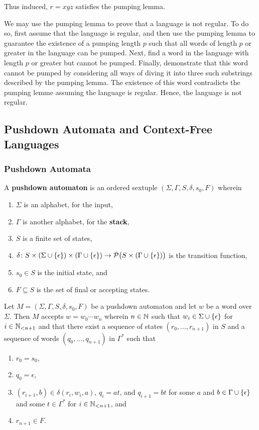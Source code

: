     Thus induced, \(r = x y z\) satisfies the pumping lemma.
\Epr

We may use the pumping lemma to prove that a language is not regular. To do so,
first assume that the language is regular, and then use the pumping lemma to
guarantee the existence of a pumping length \(p\) such that all words of length
\(p\) or greater in the language can be pumped. Next, find a word in the
language with length \(p\) or greater but cannot be pumped. Finally, demonstrate
that this word cannot be pumped by considering all ways of diving it into three
such substrings described by the pumping lemma. The existence of this word
contradicts the pumping lemme assuming the language is regular. Hence, the
language is not regular.

\subsection{Pushdown Automata and Context-Free Languages}

\subsubsection{Pushdown Automata}

\Bdf
    A {\bf pushdown automaton} is an ordered sextuple \((\Sigma, \Gamma, S,
    \delta, s_0, F)\) wherein
    \begin{enumerate}
        \item \(\Sigma\) is an alphabet, for the input,
        \item \(\Gamma\) is another alphabet, for the {\bf stack},
        \item \(S\) is a finite set of states,
        \item \(\map{\delta}{S \times (\Sigma \cup \set{\epsilon}) \times
        (\Gamma \cup \set{\epsilon})}{\pow\big(S \times (\Gamma \cup
        \set{\epsilon})\big)}\) is the transition function,
        \item \(s_0 \in S\) is the initial state, and
        \item \(F \subseteq S\) is the set of final or accepting states.
    \end{enumerate}
\Edf

Let \(M = (\Sigma, \Gamma, S, \delta, s_0, F)\) be a pushdown automaton and let
\(w\) be a word over \(\Sigma\). Then \(M\) accepts \(w = w_0 \cdots w_n\)
wherein \(n \in \setnat\) such that \(w_i \in \Sigma \cup \set{\epsilon}\) for
\(i \in \Nln[n + 1]\) and that there exist a sequence of states \((r_0, \ldots,
r_{n + 1})\) in \(S\) and a sequence of words \((q_0, \ldots, q_{n + 1})\) in
\(\Gamma^*\) such that
\begin{enumerate}
    \item \(r_0 = s_0\),
    \item \(q_0 = \epsilon\),
    \item \((r_{i + 1}, b) \in \delta(r_i, w_i, a)\), \(q_i = a t\), and \(q_{i
    + 1} = b t\) for some \(a\) and \(b \in \Gamma \cup \set{\epsilon}\) and
    some \(t \in \Gamma^*\) for \(i \in \Nln[n + 1]\), and
    \item \(r_{n + 1} \in F\).
\end{enumerate}

